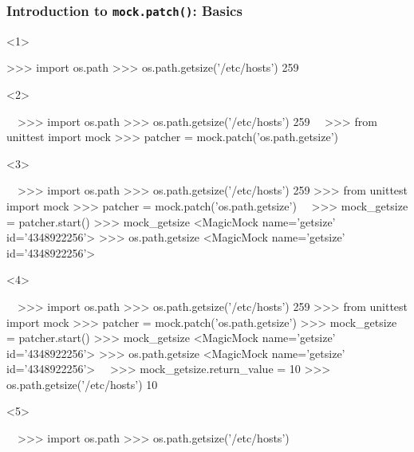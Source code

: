 \documentclass[xcolor={svgnames}]{beamer}
\newcommand{\ttcode}[2][]{\lstinline[style=plain,basicstyle=\ttfamily#1]{#2}}
\begin{document}
\begin{frame}[t,fragile]
    \frametitle{Introduction to \ttcode{mock.patch()}: Basics}
    \begin{onlyenv}<1>
        \begin{pyenv}[gobble=12]
            >>> import os.path
            >>> os.path.getsize('/etc/hosts')
            259
        \end{pyenv}
    \end{onlyenv}
    \begin{onlyenv}<2>
        \begin{pyenv}[gobble=12]
            ~~>>> import os.path
            >>> os.path.getsize('/etc/hosts')
            259~~
            >>> from unittest import mock
            >>> patcher = mock.patch('os.path.getsize')
        \end{pyenv}
    \end{onlyenv}
    \begin{onlyenv}<3>
        \begin{pyenv}[gobble=12]
            ~~>>> import os.path
            >>> os.path.getsize('/etc/hosts')
            259
            >>> from unittest import mock
            >>> patcher = mock.patch('os.path.getsize')~~
            >>> mock_getsize = patcher.start()
            >>> mock_getsize
            <MagicMock name='getsize' id='4348922256'>
            >>> os.path.getsize
            <MagicMock name='getsize' id='4348922256'>
        \end{pyenv}
    \end{onlyenv}
    \begin{onlyenv}<4>
        \begin{pyenv}[gobble=12]
            ~~>>> import os.path
            >>> os.path.getsize('/etc/hosts')
            259
            >>> from unittest import mock
            >>> patcher = mock.patch('os.path.getsize')
            >>> mock_getsize = patcher.start()
            >>> mock_getsize
            <MagicMock name='getsize' id='4348922256'>
            >>> os.path.getsize
            <MagicMock name='getsize' id='4348922256'>~~
            >>> mock_getsize.return_value = 10
            >>> os.path.getsize('/etc/hosts')
            10
        \end{pyenv}
    \end{onlyenv}
    \begin{onlyenv}<5>
        \begin{pyenv}[gobble=12]
            ~~>>> import os.path
            >>> os.path.getsize('/etc/hosts')

\end{pyenv}
\end{onlyenv}
\end{frame}
\end{document}
